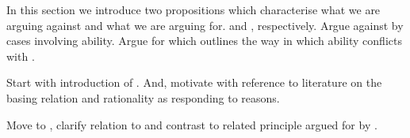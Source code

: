 \begin{note}
  In this section we introduce two propositions which characterise what we are arguing against and what we are arguing for.
  \ESU{-} and \EAS{-}, respectively.
  Argue against \ESU{} by cases involving ability.
  Argue for \EAS{} which outlines the way in which ability conflicts with \ESU{}.

  Start with introduction of \ESU{}.
  And, motivate with reference to literature on the basing relation and rationality as responding to reasons.

  Move to \EAS{}, clarify relation to \ESU{} and contrast to related principle argued for by \citeauthor{Moretti:2019wx}.
\end{note}

\subsubsection{\ESU{}}
\label{sec:esu}

